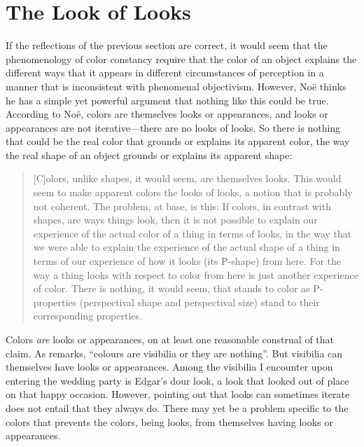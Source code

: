 \documentclass[12pt]{article}
\begin{document}

\section{The Look of Looks} %
\label{sec:the_look_of_looks}

If the reflections of the previous section are correct, it would seem that the phenomenology of color constancy require that the color of an object explains the different ways that it appears in different circumstances of perception in a manner that is inconsistent with phenomenal objectivism. However, Noë thinks he has a simple yet powerful argument that nothing like this could be true. According to Noë, colors are themselves looks or appearances, and looks or appearances are not iterative---there are no looks of looks. So there is nothing that could be the real color that grounds or explains its apparent color, the way the real shape of an object grounds or explains its apparent shape:
	\begin{quote}
		[C]olors, unlike shapes, it would seem, are themselves looks. This would seem to make apparent colors the looks of looks, a notion that is probably not coherent. The problem, at base, is this: If colors, in contrast with shapes, are ways things look, then it is not possible to explain our experience of the actual color of a thing in terms of looks, in the way that we were able to explain the experience of the actual shape of a thing in terms of our experience of how it looks (its P-shape) from here. For the way a thing looks with respect to color from here is just another experience of color. There is nothing, it would seem, that stands to color as P-properties (perspectival shape and perspectival size) stand to their corresponding properties. \citep[133]{Noe:2004fk}
	\end{quote}

Colors \emph{are} looks or appearances, on at least one reasonable construal of that claim. As \citet[109]{Strawson:1966kx} remarks, ``colours are visibilia or they are nothing''. But visibilia can themselves have looks or appearances. Among the visibilia I encounter upon entering the wedding party is Edgar's dour look, a look that looked out of place on that happy occasion. However, pointing out that looks can sometimes iterate does not entail that they always do. There may yet be a problem specific to the colors that prevents the colors, being looks, from themselves having looks or appearances.
\end{document}
